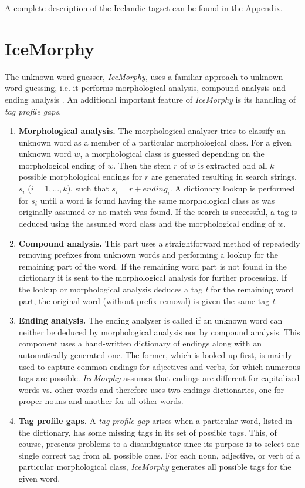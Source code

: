 \documentclass[11pt]{article}
\begin{document}
A complete description of the Icelandic tagset can be found in the Appendix.

\section{IceMorphy}
\label{sec:iceMorphy}
The unknown word guesser, \emph{IceMorphy}, uses a familiar approach to unknown word guessing, i.e. it performs morphological analysis, compound analysis and ending analysis \citep{mik97,nak03}.
An additional important feature of \emph{IceMorphy} is its handling of \emph{tag profile gaps}.
\begin{enumerate}
\item{\bf Morphological analysis.}
The morphological analyser tries to classify an unknown word as a member of a particular morphological class.
For a given unknown word $w$, a morphological class is guessed depending on the morphological ending of $w$.
Then the stem $r$ of $w$ is extracted and all $k$ possible morphological endings for $r$ are generated resulting in search strings, $s_{i}$ ($i=1,\ldots,k$), such that $s_{i}=r+ending_{i}$.
A dictionary lookup is performed for $s_{i}$ until a word is found having the same morphological class as was originally assumed or no match was found.
If the search is successful, a tag is deduced using the assumed word class and the morphological ending of $w$.

\item{\bf Compound analysis.}
This part uses a straightforward method of repeatedly removing prefixes from unknown words and performing a lookup for the remaining part of the word.
If the remaining word part is not found in the dictionary it is sent to the morphological analysis for further processing.
If the lookup or morphological analysis deduces a tag \emph{t} for the remaining word part, the original word (without prefix removal) is given the same tag \emph{t}.

\item{\bf Ending analysis.}
The ending analyser is called if an unknown word can neither be deduced by morphological analysis nor by compound analysis.
This component uses a hand-written dictionary of endings along with an automatically generated one.
The former, which is looked up first, is mainly used to capture common endings for adjectives and verbs, for which numerous tags are possible.
\emph{IceMorphy} assumes that endings are different for capitalized words vs. other words and therefore uses two endings dictionaries, one for proper nouns and another for all other words.

\item{\bf Tag profile gaps.}
A \emph{tag profile gap} arises when a particular word, listed in the dictionary, has some missing tags in its set of possible tags.
This, of course, presents problems to a disambiguator since its purpose is to select one single correct tag from all possible ones.
For each noun, adjective, or verb of a particular morphological class, \emph{IceMorphy} generates all possible tags for the given word.
\end{enumerate}
\end{document}

